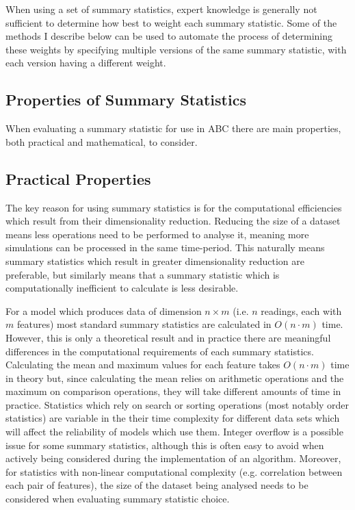 \documentclass[bibliography=totoc,11pt,a4paper,margin=0]{article}
\theoremstyle{break}
\begin{document}
  \par When using a set of summary statistics, expert knowledge is generally not sufficient to determine how best to weight each summary statistic. Some of the methods I describe below can be used to automate the process of determining these weights by specifying multiple versions of the same summary statistic, with each version having a different weight. %

\subsection{Properties of Summary Statistics}\label{sec_properties_of_summary_statistics}

  \par When evaluating a summary statistic for use in ABC there are main properties, both practical and mathematical, to consider.

\subsection*{Practical Properties}

  \par The key reason for using summary statistics is for the computational efficiencies which result from their dimensionality reduction. Reducing the size of a dataset means less operations need to be performed to analyse it, meaning more simulations can be processed in the same time-period. This naturally means summary statistics which result in greater dimensionality reduction are preferable, but similarly means that a summary statistic which is computationally inefficient to calculate is less desirable.

  \par For a model which produces data of dimension $n\times m$ (i.e. $n$ readings, each with $m$ features) most standard summary statistics are calculated in $O(n\cdot m)$  time. However, this is only a theoretical result and in practice there are meaningful differences in the computational requirements of each summary statistics. Calculating the mean and maximum values for each feature takes $O(n\cdot m)$ time in theory but, since calculating the mean relies on arithmetic operations and the maximum on comparison operations, they will take different amounts of time in practice. Statistics which rely on search or sorting operations (most notably order statistics) are variable in the their time complexity for different data sets which will affect the reliability of models which use them. Integer overflow is a possible issue for some summary statistics, although this is often easy to avoid when actively being considered during the implementation of an algorithm. Moreover, for statistics with non-linear computational complexity (e.g. correlation between each pair of features), the size of the dataset being analysed needs to be considered when evaluating summary statistic choice.
\end{document}
